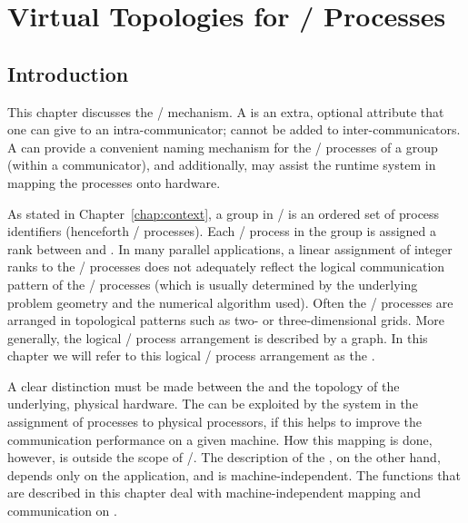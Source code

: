 \chapter{Virtual Topologies for \texorpdfstring{\MPI/}{MPI} Processes}
\label{sec:topol}
\label{chap:topol}

\section{Introduction}

This chapter discusses the \MPI/  mechanism.  A  is an extra,
optional attribute that one can give to an intra-communicator; 
cannot be added to inter-communicators.  A  can provide a convenient
naming mechanism for the \MPI/ processes of a group (within a communicator), and
additionally, may assist the runtime system in mapping the processes onto
hardware.

As stated in Chapter~\ref{chap:context},
a group in \MPI/ is an ordered set of  process identifiers (henceforth
\MPI/ processes). Each \MPI/ process in
the group is assigned a rank between  and . In many parallel
applications, a linear assignment of integer ranks to the \MPI/ processes does not adequately reflect the logical
communication pattern of the \MPI/ processes (which is usually determined by the
underlying problem geometry and the numerical algorithm used).  Often the
\MPI/ processes are arranged in topological patterns such as two- or
three-dimensional grids. More generally, the logical \MPI/ process arrangement is
described by a graph.  In this chapter we will refer to this logical \MPI/ process
arrangement as the .

A clear distinction must be made between the  and the
topology of the underlying, physical hardware.  The  can be
exploited by the system in the assignment of processes to physical processors,
if this helps to improve the communication performance on a given machine. How
this mapping is done, however, is outside the scope of \MPI/.  The description
of the , on the other hand, depends only on the application,
and is machine-independent. 
The functions that are described in this chapter
deal with machine-independent 
mapping and communication on .

